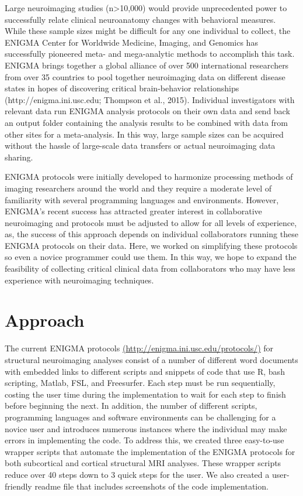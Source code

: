 \documentclass[twocolumn]{bmcart}%
\begin{document}
Large neuroimaging studies (n\textgreater{}10,000) would provide
unprecedented power to successfully relate clinical neuroanatomy changes
with behavioral measures. While these sample sizes might be difficult
for any one individual to collect, the ENIGMA Center for Worldwide
Medicine, Imaging, and Genomics has successfully pioneered meta- and
mega-analytic methods to accomplish this task. ENIGMA brings together a
global alliance of over 500 international researchers from over 35
countries to pool together neuroimaging data on different disease states
in hopes of discovering critical brain-behavior relationships
(http://enigma.ini.usc.edu; Thompson et al., 2015). Individual
investigators with relevant data run ENIGMA analysis protocols on their
own data and send back an output folder containing the analysis results
to be combined with data from other sites for a meta-analysis. In this
way, large sample sizes can be acquired without the hassle of
large-scale data transfers or actual neuroimaging data sharing.

ENIGMA protocols were initially developed to harmonize processing
methods of imaging researchers around the world and they require a
moderate level of familiarity with several programming languages and
environments. However, ENIGMA's recent success has attracted greater
interest in collaborative neuroimaging and protocols must be adjusted to
allow for all levels of experience, as, the success of this approach
depends on individual collaborators running these ENIGMA protocols on
their data. Here, we worked on simplifying these protocols so even a
novice programmer could use them. In this way, we hope to expand the
feasibility of collecting critical clinical data from collaborators who
may have less experience with neuroimaging techniques.

\section{Approach}\label{approach}

The current ENIGMA protocols \url{(http://enigma.ini.usc.edu/protocols/)} for
structural neuroimaging analyses consist of a number of different word
documents with embedded links to different scripts and snippets of code
that use R, bash scripting, Matlab, FSL, and Freesurfer. Each step must
be run sequentially, costing the user time during the implementation to
wait for each step to finish before beginning the next. In addition, the
number of different scripts, programming languages and software
environments can be challenging for a novice user and introduces
numerous instances where the individual may make errors in implementing
the code. To address this, we created three easy-to-use wrapper scripts
that automate the implementation of the ENIGMA protocols for both
subcortical and cortical structural MRI analyses. These wrapper scripts
reduce over 40 steps down to 3 quick steps for the user. We also created
a user-friendly readme file that includes screenshots of the code
implementation.
\end{document}
